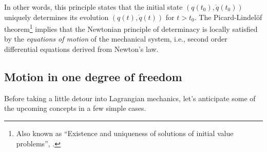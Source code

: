 \documentclass[english,fontsize=11pt,paper=b5]{scrbook}
\theoremstyle{definition}
\begin{document}
  In other words, this principle states that the initial state $\left(q(t_0), \dot q(t_0)\right)$ uniquely determines its evolution $\left(q(t),\dot q(t)\right)$ for $t > t_0$.
  The Picard-Lindel\"of theorem\footnote{Also known as ``Existence and uniqueness of solutions of initial value problems'', \cite[Theorem 3.17]{book:knauf}.} implies that the Newtonian principle of determinacy is locally satisfied by the \emph{equations of motion} of the mechanical system, i.e., second order differential equations derived from Newton's law.

  \subsection{Motion in one degree of freedom}

  Before taking a little detour into Lagrangian mechanics, let's anticipate some of the upcoming concepts in a few simple cases.
\end{document}
